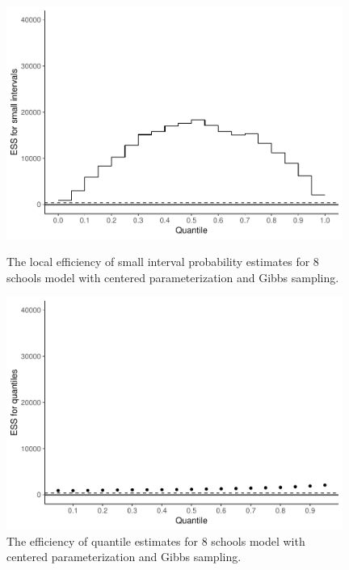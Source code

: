 \documentclass[american,]{article}
\begin{document}
\begin{figure}[tp]
  \centering
  \begin{minipage}{0.48\textwidth}
  \includegraphics[width=0.98\textwidth]{graphics/local-ess-jags-cp-tau-longer-1.pdf}
  \caption{The local efficiency of small interval probability estimates for 8 schools model with centered parameterization and Gibbs sampling.}
  \label{fig:local-ess-jags-cp-tau-longer-1}
\end{minipage}
\hfill
  \begin{minipage}{0.48\textwidth}
  \includegraphics[width=0.98\textwidth]{graphics/quantile-ess-jags-cp-tau-longer-1.pdf}
  \caption{The efficiency of quantile estimates for 8 schools model with centered parameterization and Gibbs sampling.}
  \label{fig:quantile-ess-jags-cp-tau-longer-1}
\end{minipage}
\end{figure}
\end{document}
